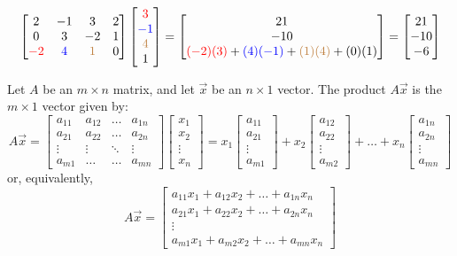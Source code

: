 \documentclass{ximera}
\begin{document}
\begin{example}
$$\begin{bmatrix}2&-1&3&2\\0&3&-2&1\\{\color{red}-2}&{\color{blue}4}&{\color{brown}1}&0\end{bmatrix}\begin{bmatrix}{\color{red}3}\\{\color{blue}-1}\\{\color{brown}4}\\1\end{bmatrix}=\begin{bmatrix}21\\-10\\{\color{red}(-2)( 3)}+{\color{blue}(4)(-1)}+{\color{brown}(1)(4)}+(0)(1) \end{bmatrix}=\begin{bmatrix}21\\-10 \\ -6\end{bmatrix}
$$
\end{example}
\begin{definition}\label{def:matrixvectormult}
Let $A$ be an $m\times n$ matrix, and let $\vec{x}$ be an $n\times 1$ vector.  The product $A\vec{x}$ is the $m\times 1$ vector given by:
$$A\vec{x}=\begin{bmatrix}
           a_{11} & a_{12}&\dots&a_{1n}\\
           a_{21}&a_{22} &\dots &a_{2n}\\
		\vdots & \vdots&\ddots &\vdots\\
		a_{m1}&\dots &\dots &a_{mn}
         \end{bmatrix}\begin{bmatrix}x_1\\x_2\\\vdots\\x_n\end{bmatrix}=
         x_1\begin{bmatrix}a_{11}\\a_{21}\\ \vdots \\a_{m1}\end{bmatrix}+
         x_2\begin{bmatrix}a_{12}\\a_{22}\\ \vdots \\a_{m2}\end{bmatrix}+\dots+
         x_n\begin{bmatrix}a_{1n}\\a_{2n}\\ \vdots \\a_{mn}\end{bmatrix}$$
or, equivalently,
$$A\vec{x}=\begin{bmatrix}a_{11}x_1+a_{12}x_2+\ldots +a_{1n}x_n\\a_{21}x_1+a_{22}x_2+\ldots +a_{2n}x_n\\\vdots\\a_{m1}x_1+a_{m2}x_2+\ldots +a_{mn}x_n\end{bmatrix}$$
\end{definition}
\end{document}
